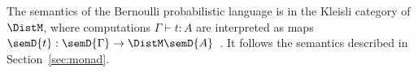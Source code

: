 
The semantics of the Bernoulli probabilistic language is in the Kleisli category of $\DistM$, where computations $\Gamma \vdash t: A$ are interpreted as maps $\semD{t} : \semD{\Gamma} \to \DistM\semD{A}$~\cite{moggi:computation_and_monads}. It follows the semantics described in Section~\ref{sec:monad}.





